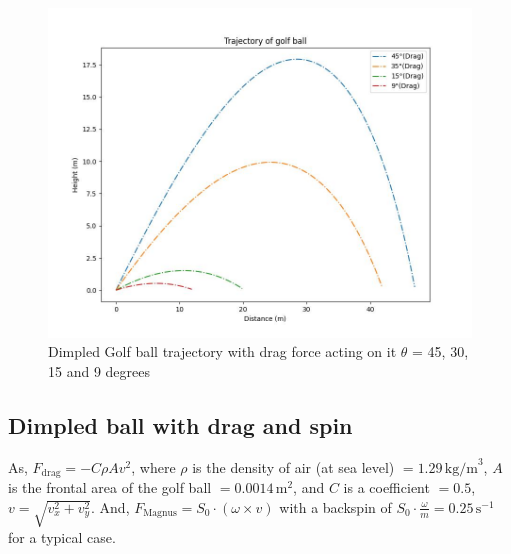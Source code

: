 \documentclass[11pt]{article}
\begin{document}
\begin{figure}[b]
    \centering
    \includegraphics[width=\textwidth, height=\textheight, keepaspectratio]{Golf_Trajectory_Smooth_Drag.jpeg}
    \caption{Dimpled Golf ball trajectory with drag force acting on it $\theta$ = 45, 30, 15 and 9 degrees}
    \label{fig:Dimpled_Fdrag_trajectory}
\end{figure}

\subsection{Dimpled ball with drag and spin}

As, \(F_{\text{drag}} = -C\rho Av^2\), where \(\rho\) is the density of air (at sea level) \(= 1.29 \, \text{kg/m}^3\), \(A\) is the frontal area of the golf ball \(= 0.0014 \, \text{m}^2\), and \(C\) is a coefficient \(= 0.5\), \(v = \sqrt{v_x^2 + v_y^2}\).
And, \(F_{\text{Magnus}} = S_0 \cdot (\omega \times v)\) with a backspin of \(S_0 \cdot \frac{\omega}{m} = 0.25 \, \text{s}^{-1}\) for a typical case.
\end{document}
